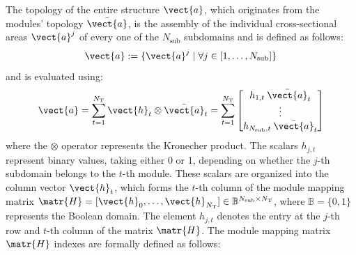 The topology of the entire structure $\vect{a}$, which originates from the modules' topology $\bar{\vect{a}}$, is the assembly of the individual cross-sectional areas $\vect{a}^j$ of every one of the $N_{\text{sub}}$ subdomains and is defined as follows:
\begin{equation}
    \vect{a} :=  \{\vect{a}^j \;|\; \forall j \in [1,\dots,N_{\text{sub}}]\}
\end{equation}
and is evaluated using:
\begin{equation}
    \vect{a} = \sum_{t=1}^{N_\text{T}} \vect{h}_t\otimes\bar{\vect{a}}_t = \sum_{t=1}^{N_\text{T}} \begin{bmatrix}
        h_{1,t} \: \bar{\vect{a}}_t \\
        \vdots\\
        h_{N_{\text{sub}},t} \: \bar{\vect{a}}_t 
        \end{bmatrix}
        \label{eq:05_VL}
\end{equation}
where the $\otimes$ operator represents the Kronecher product. The scalars $h_{j,t}$ represent binary values, taking either 0 or 1, depending on whether the $j$-th subdomain belongs to the $t$-th module. These scalars are organized into the column vector $\vect{h}_{t}$, which forms the $t$-th column of the module mapping matrix $\matr{H} = [\vect{h}_0,\dots,\vect{h}_{N_\text{T}}] \in \mathbb{B}^{N_{\text{sub}} \times N_\text{T}}$, where $\mathbb{B}=\lbrace 0,1 \rbrace$ represents the Boolean domain. The element $h_{j,t}$ denotes the entry at the $j$-th row and $t$-th column of the matrix $\matr{H}$. The module mapping matrix $\matr{H}$ indexes are formally defined as follows:
